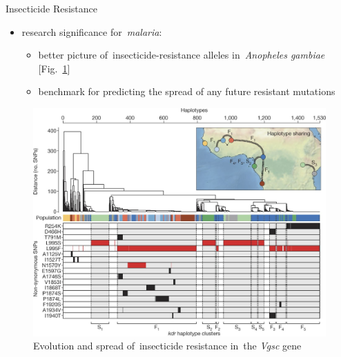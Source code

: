 \documentclass[final,hyperref={pdfpagelabels=false}]{beamer}
\begin{document}
\begin{frame}[t]
\begin{columns}[t]
\begin{column}{.465\textwidth}
\begin{block}{Insecticide Resistance}

\begin{itemize}
\item research significance for~\emph{malaria}:
    \begin{itemize}
	\item better picture  of~insecticide-resistance alleles in~\emph{Anopheles gambiae} [Fig.~\ref{fig:4-mosq}]
	\item benchmark for predicting the spread of any future resistant mutations
    \end{itemize}
\end{itemize}

\begin{figure}
\includegraphics[width=.7\linewidth]{nature-mosquitoes/fig_4}
\caption{Evolution and spread of~insecticide resistance in~the \textit{Vgsc} gene \cite{anopheles2017genetic}}
\label{fig:4-mosq}
\end{figure}

\end{block}



\end{column}
\end{columns}
\end{frame}
\end{document}
